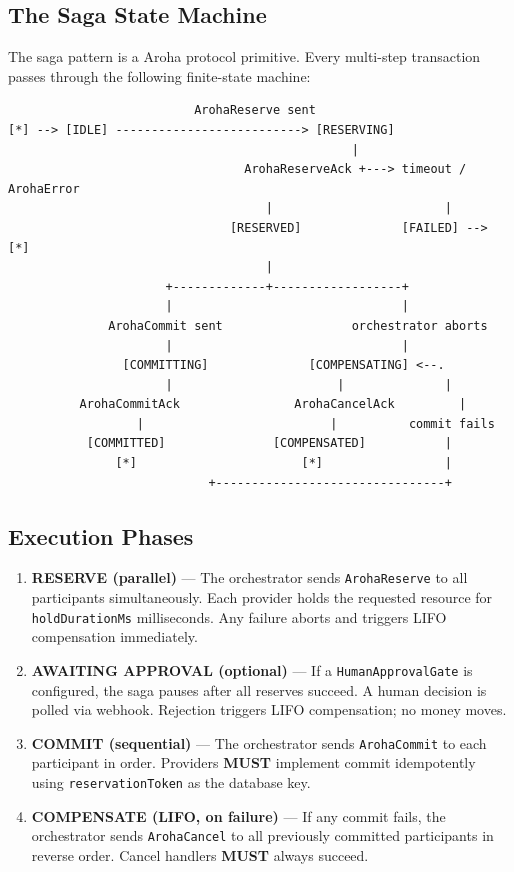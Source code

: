 \documentclass[11pt,a4paper]{article}
\begin{document}
\subsection{The Saga State Machine}

The saga pattern is a Aroha protocol primitive. Every multi-step transaction passes
through the following finite-state machine:

\begin{verbatim}
                          ArohaReserve sent
[*] --> [IDLE] --------------------------> [RESERVING]
                                                |
                                 ArohaReserveAck +---> timeout / ArohaError
                                    |                        |
                               [RESERVED]              [FAILED] --> [*]
                                    |
                      +-------------+------------------+
                      |                                |
              ArohaCommit sent                  orchestrator aborts
                      |                                |
                [COMMITTING]              [COMPENSATING] <--.
                      |                       |              |
          ArohaCommitAck                ArohaCancelAck         |
                  |                          |          commit fails
           [COMMITTED]               [COMPENSATED]           |
               [*]                       [*]                 |
                            +--------------------------------+
\end{verbatim}

\subsection{Execution Phases}

\begin{enumerate}[label=\textbf{Phase \arabic*:}]
  \item \textbf{RESERVE (parallel)} --- The orchestrator sends \texttt{ArohaReserve}
        to all participants simultaneously. Each provider holds the requested
        resource for \texttt{holdDurationMs} milliseconds. Any failure aborts and
        triggers LIFO compensation immediately.

  \item \textbf{AWAITING APPROVAL (optional)} --- If a \texttt{HumanApprovalGate}
        is configured, the saga pauses after all reserves succeed. A human decision
        is polled via webhook. Rejection triggers LIFO compensation; no money moves.

  \item \textbf{COMMIT (sequential)} --- The orchestrator sends \texttt{ArohaCommit}
        to each participant in order. Providers \textbf{MUST} implement commit
        idempotently using \texttt{reservationToken} as the database key.

  \item \textbf{COMPENSATE (LIFO, on failure)} --- If any commit fails, the
        orchestrator sends \texttt{ArohaCancel} to all previously committed
        participants in reverse order. Cancel handlers \textbf{MUST} always succeed.
\end{enumerate}
\end{document}

